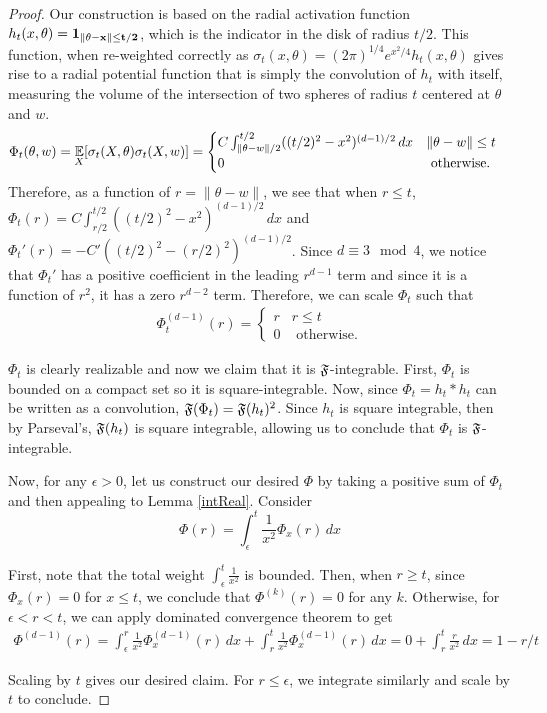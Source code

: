 \begin{proof}
Our construction is based on the radial activation function $h_t(x, \theta) = \bf{1}_{\|\theta - x\| \leq t/2}$, which is the indicator in the disk of radius $t/2$. This function, when re-weighted correctly as $\sigma_t(x,\theta) =  (2\pi)^{1/4} e^{x^2/4}h_t(x,\theta)$ gives rise to a radial potential function that is simply the convolution of $h_t$ with itself, measuring the volume of the intersection of two spheres of radius $t$ centered at $\theta$ and $w$.
%
\begin{align*}
\Phi_t(\theta, w) & = \operatorname*{\mathbb{E}}_X[\sigma_t(X,\theta)\sigma_t(X,w)]
= \begin{cases}
C\int_{\|\theta - w\|/2}^{t/2} ((t/2)^2 - x^2)^{(d-1)/2} \, dx & \|\theta - w\| \leq t\\
0 & \textrm{ otherwise.}
\end{cases}
\end{align*}
%
Therefore, as a function of $r=\|\theta - w \|$, we see that when $r \leq t$, $\Phi_t(r) = C\int_{r/2}^{t/2} ((t/2)^2-x^2)^{(d-1)/2} \, dx$ and $\Phi_t'(r) = -C'((t/2)^2-(r/2)^2)^{(d-1)/2}$. Since $d \equiv 3 \mod 4$, we notice that $\Phi_t'$ has a positive coefficient in the leading $r^{d-1}$ term and since it is a function of $r^2$, it has a zero $r^{d-2}$ term. Therefore, we can scale $\Phi_t$ such that 
\begin{align*}
\Phi_t^{(d-1)}(r) = \begin{cases}
r & r \leq t\\
0 & \textrm{ otherwise.}
\end{cases} 
\end{align*}

$\Phi_t$ is clearly realizable and now we claim that it is ${\mathfrak{F}}$-integrable. First, $\Phi_t$ is bounded on a compact set so it is square-integrable. Now, since $\Phi_t = h_t \ast h_t$ can be written as a convolution, ${\mathfrak{F}}(\Phi_t) = {\mathfrak{F}}(h_t)^2$. Since $h_t$ is square integrable, then by Parseval's, ${\mathfrak{F}}(h_t)$ is square integrable, allowing us to conclude that $\Phi_t$ is ${\mathfrak{F}}$-integrable.

Now, for any $\epsilon > 0$, let us construct our desired $\Phi$ by taking a positive sum of $\Phi_t$ and then appealing to Lemma \ref{intReal}. Consider
%
\[\Phi(r) = \int_{\epsilon}^{t} \frac{1}{x^2}\Phi_x(r) \, dx\]

First, note that the total weight $\int_\epsilon^t \frac{1}{x^2}$ is bounded. Then, when $r \geq t$, since $\Phi_x(r) = 0$ for $x \leq t$, we conclude that $\Phi^{(k)}(r) = 0$ for any $k$. Otherwise, for $\epsilon < r < t$, we can apply dominated convergence theorem to get
\begin{align*}
\Phi^{(d-1)}(r) = \int_{\epsilon}^r \frac{1}{x^2}\Phi_x^{(d-1)}(r) \, dx + \int_{r}^t \frac{1}{x^2} \Phi_x^{(d-1)}(r) \, dx
 = 0 + \int_r^t \frac{r}{x^2} \, dx = 1 -r/t 
\end{align*}

Scaling by $t$ gives our desired claim. For $r\leq \epsilon$, we integrate similarly and scale by $t$ to conclude.
\end{proof}

